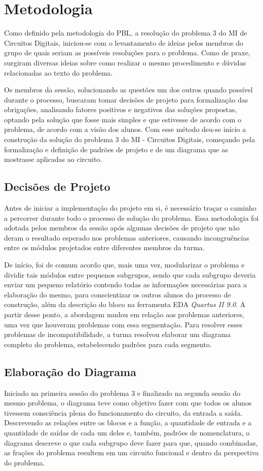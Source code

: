 \documentclass[12pt]{article}
\begin{document}
\section{Metodologia}
Como definido pela metodologia do PBL, a resolução do problema 3 do MI de Circuitos Digitais, iniciou-se com o levantamento de ideias pelos membros do grupo de quais seriam as possíveis resoluções para o problema. Como de praxe, surgiram diversas ideias sobre como realizar o mesmo procedimento e dúvidas relacionadas ao texto do problema. 

Os membros da sessão, solucionando as questões um dos outros quando possível durante o processo, buscaram tomar decisões de projeto para formalização das obrigações, analisando fatores positivos e negativos das soluções propostas, optando pela solução que fosse mais simples e que estivesse de acordo com o problema, de acordo com a visão dos alunos. Com esse método deu-se início a construção da solução do problema 3 do MI - Circuitos Digitais, começando pela formalização e definição de padrões de projeto e de um diagrama que as mostrasse aplicadas ao circuito.

\subsection{Decisões de Projeto}

Antes de iniciar a implementação do projeto em si, é necessário traçar o caminho a percorrer durante todo o processo de solução do problema. Essa metodologia foi adotada pelos membros da sessão após algumas decisões de projeto que não deram o resultado esperado nos problemas anteriores, causando incongruências entre os módulos projetados entre diferentes membros da turma. 

De início, foi de comum acordo que, mais uma vez, modularizar o problema e dividir tais módulos entre pequenos subgrupos, sendo que cada subgrupo deveria enviar um pequeno relatório contendo todas as informações necessárias para a elaboração do mesmo, para conscientizar os outros alunos do processo de construção, além da descrição do bloco na ferramenta EDA \textit{Quartus II 9.0}. A partir desse ponto, a abordagem mudou em relação aos problemas anteriores, uma vez que houveram problemas com essa segmentação. Para resolver esses problemas de incompatibilidade, a turma resolvou elaborar um diagrama completo do problema, estabelecendo padrões para cada segmento.

\subsection{Elaboração do Diagrama}
Iniciado na primeira sessão do problema 3 e finalizado na segunda sessão do mesmo problema, o diagrama teve como objetivo fazer com que todos os alunos tivessem consciência plena do funcionamento do circuito, da entrada a saída. Descrevendo as relações entre os blocos e a função, a quantidade de entrada e a quantidade de saídas de cada um deles e, também,  padrões de nomenclatura, o diagrama descreve o que cada subgrupo deve fazer para que, quando combinadas, as frações do problema resultem em um circuito funcional e dentro da perspectiva do problema. 
\end{document}
